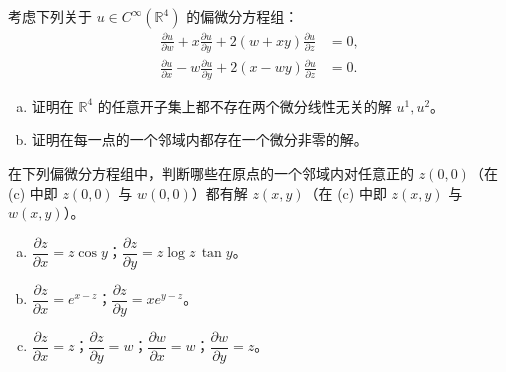\documentclass[../../main.tex]{subfiles}
\begin{document}
\begin{exercise}\label{exercise:ch19-12}
考虑下列关于 $u\in C^\infty(\mathbb{R}^4)$ 的偏微分方程组：
\begin{align*}
\frac{\partial u}{\partial w}+x\frac{\partial u}{\partial y}+2(w+xy)\frac{\partial u}{\partial z}&=0,\\
\frac{\partial u}{\partial x}-w\frac{\partial u}{\partial y}+2(x-wy)\frac{\partial u}{\partial z}&=0.
\end{align*}
\begin{enumerate}[(a)]
\item 证明在 $\mathbb{R}^4$ 的任意开子集上都不存在两个微分线性无关的解 $u^1,u^2$。
\item 证明在每一点的一个邻域内都存在一个微分非零的解。
\end{enumerate}
\end{exercise}

\begin{exercise}\label{exercise:ch19-13}
在下列偏微分方程组中，判断哪些在原点的一个邻域内对任意正的 $z(0,0)$（在 (c) 中即 $z(0,0)$ 与 $w(0,0)$）都有解 $z(x,y)$（在 (c) 中即 $z(x,y)$ 与 $w(x,y)$）。
\begin{enumerate}[(a)]
\item $\dfrac{\partial z}{\partial x}=z\cos y$；$\dfrac{\partial z}{\partial y}=z\log z\,\tan y$。
\item $\dfrac{\partial z}{\partial x}=e^{x-z}$；$\dfrac{\partial z}{\partial y}=x e^{y-z}$。
\item $\dfrac{\partial z}{\partial x}=z$；$\dfrac{\partial z}{\partial y}=w$；$\dfrac{\partial w}{\partial x}=w$；$\dfrac{\partial w}{\partial y}=z$。
\end{enumerate}
\end{exercise}
\end{document}
